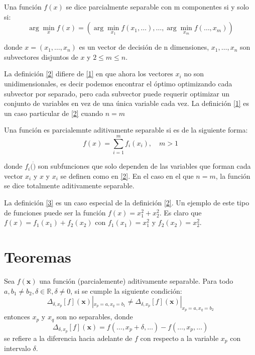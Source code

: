 \begin{definicion}
\label{2}
Una función \(f(x)\) se dice parcialmente separable con m componentes si y solo si:
\[
\arg \min_{x} f(x) =
\left(
\arg \min_{x_1} f(x_1, \ldots), \ldots, \arg \min_{x_m} f(\ldots, x_m)
\right)
\]

donde \( x = (x_1, \ldots, x_n) \) es un vector de decisión de n dimensiones, \(x_1, \ldots, x_n \) son subvectores disjuntos de \(x\) y \( 2 \leq m \leq n\).

La definición \ref{2} difiere de \ref{1} en que ahora los vectores \(x_i\) no son unidimensionales, es decir podemos encontrar el óptimo optimizando cada subvector por separado, pero cada subvector puede requerir optimizar un conjunto de variables en vez de una única variable cada vez. La definición \ref{1} es un caso particular de \ref{2} cuando \(n = m\)

\end{definicion}

\begin{definicion}
\label{3}
Una función es parcialemnte aditivamente separable si es de la siguiente forma:
\[
f(x) = \sum_{i=1}^{m} f_i(x_i), \quad m > 1
\]

donde \(f_i(\dot) \) son subfunciones que solo dependen de las variables que forman cada vector \( x_i \) y  \( x \) y \( x_i \) se definen como en \ref{2}. En el caso en el que \(n = m\), la función se dice totalmente aditivamente separable.

\end{definicion}

La definición \ref{3} es un caso especial de la definición \ref{2}. Un ejemplo de este tipo de funciones puede ser la función \( f(x) = x_1^2 + x_2^2 \). Es claro que \( f(x) = f_1(x_1) + f_2(x_2) \) con \( f_1(x_1) = x_1^2 \) y \( f_2(x_2) = x_2^2 \).

\section{Teoremas}

\begin{teorema}
\label{T1}
Sea \( f(\mathbf{x}) \) una función (parcialemente) aditivamente separable. Para todo \( a, b_1 \neq b_2, \delta \in \mathbb{R}, \delta \neq 0 \), si se cumple la siguiente condición:
\[
\Delta_{\delta,x_p}[f](\mathbf{x})|_{x_p=a, x_q=b_1} \neq \Delta_{\delta,x_p}[f](\mathbf{x})|_{x_p=a, x_q=b_2}
\]
entonces \( x_p \) y \( x_q \) son no separables, donde
\[
\Delta_{\delta,x_p}[f](\mathbf{x}) = f(\ldots, x_p + \delta, \ldots) - f(\ldots, x_p, \ldots)
\]
se refiere a la diferencia hacia adelante de \( f \) con respecto a la variable \( x_p \) con intervalo \( \delta \).
\end{teorema}


